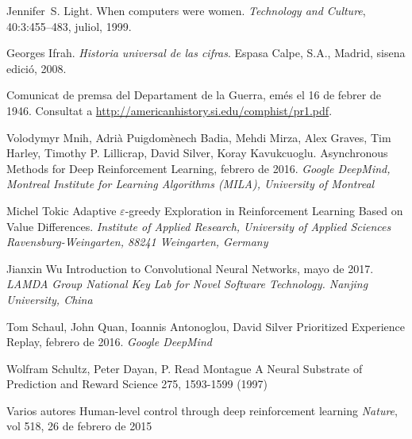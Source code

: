 \documentclass[11pt,spanish,listoffigures,listoftables]{tfgetsinf}
\begin{document}
\begin{thebibliography}{10}

   Jennifer~S. Light.
   \newblock When computers were women.
   \newblock \textit{Technology and Culture}, 40:3:455--483, juliol, 1999.

   Georges Ifrah.
   \newblock \textit{Historia universal de las cifras}.
   \newblock Espasa Calpe, S.A., Madrid, sisena edició, 2008.

   Comunicat de premsa del Departament de la Guerra, 
   emés el 16 de febrer de 1946. 
   \newblock Consultat a 
   \url{http://americanhistory.si.edu/comphist/pr1.pdf}.
   
	Volodymyr Mnih, Adrià Puigdomènech Badia, Mehdi Mirza, Alex Graves, Tim Harley, Timothy P. Lillicrap, David Silver, Koray Kavukcuoglu.
	\newblock Asynchronous Methods for Deep Reinforcement Learning,
	febrero de 2016.
	\newblock \textit {Google DeepMind, Montreal Institute for Learning Algorithms (MILA), University of Montreal}
	
	Michel Tokic
	\newblock Adaptive $\varepsilon$-greedy Exploration in Reinforcement Learning Based on Value Differences.
	\newblock \textit {Institute of Applied Research, University of Applied Sciences Ravensburg-Weingarten, 88241 Weingarten, Germany}
	
	Jianxin Wu
	\newblock Introduction to Convolutional Neural Networks,
	mayo de 2017.
	\newblock \textit {LAMDA Group \newblock National Key Lab for Novel Software Technology. Nanjing University, China}
	
	Tom Schaul, John Quan, Ioannis Antonoglou, David Silver
	\newblock Prioritized Experience Replay,
	febrero de 2016.
	\newblock \textit {Google DeepMind}
	
	 Wolfram Schultz, Peter Dayan, P. Read Montague
	 \newblock A Neural Substrate of Prediction and Reward
	 Science 275, 1593-1599 (1997)
	 
	Varios autores
	\newblock Human-level control through deep reinforcement learning
	\newblock \textit{Nature}, vol 518, 26 de febrero de 2015

\end{thebibliography}
\cleardoublepage
\end{document}
